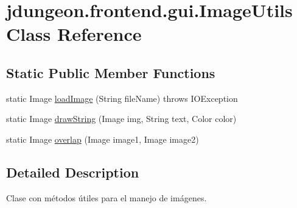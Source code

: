 \hypertarget{classjdungeon_1_1frontend_1_1gui_1_1_image_utils}{
\section{jdungeon.frontend.gui.ImageUtils Class Reference}
\label{classjdungeon_1_1frontend_1_1gui_1_1_image_utils}
}
\subsection*{Static Public Member Functions}
\begin{DoxyCompactItemize}
\item 
static Image \hyperlink{classjdungeon_1_1frontend_1_1gui_1_1_image_utils_ae8f0efc5840d3e7ebc08766a67c06927}{loadImage} (String fileName)  throws IOException 
\item 
static Image \hyperlink{classjdungeon_1_1frontend_1_1gui_1_1_image_utils_af4c01a2095bc6f6a254d7f2f984f768a}{drawString} (Image img, String text, Color color)
\item 
static Image \hyperlink{classjdungeon_1_1frontend_1_1gui_1_1_image_utils_af718dec2a55f6683d3f083a78e02b6ef}{overlap} (Image image1, Image image2)
\end{DoxyCompactItemize}


\subsection{Detailed Description}
Clase con métodos útiles para el manejo de imágenes. 

